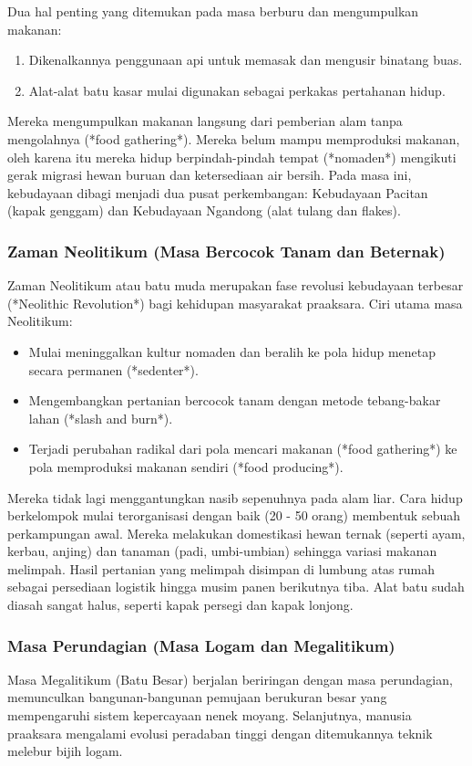 \documentclass[12pt, a4paper]{article}
\begin{document}
Dua hal penting yang ditemukan pada masa berburu dan mengumpulkan makanan:
\begin{enumerate}
	\item Dikenalkannya penggunaan api untuk memasak dan mengusir binatang buas.
	\item Alat-alat batu kasar mulai digunakan sebagai perkakas pertahanan hidup.
\end{enumerate}
Mereka mengumpulkan makanan langsung dari pemberian alam tanpa mengolahnya (*food gathering*). Mereka belum mampu memproduksi makanan, oleh karena itu mereka hidup berpindah-pindah tempat (*nomaden*) mengikuti gerak migrasi hewan buruan dan ketersediaan air bersih. Pada masa ini, kebudayaan dibagi menjadi dua pusat perkembangan: Kebudayaan Pacitan (kapak genggam) dan Kebudayaan Ngandong (alat tulang dan flakes).

\subsubsection{Zaman Neolitikum (Masa Bercocok Tanam dan Beternak)}
Zaman Neolitikum atau batu muda merupakan fase revolusi kebudayaan terbesar (*Neolithic Revolution*) bagi kehidupan masyarakat praaksara. Ciri utama masa Neolitikum:
\begin{itemize}
	\item Mulai meninggalkan kultur nomaden dan beralih ke pola hidup menetap secara permanen (*sedenter*).
	\item Mengembangkan pertanian bercocok tanam dengan metode tebang-bakar lahan (*slash and burn*).
	\item Terjadi perubahan radikal dari pola mencari makanan (*food gathering*) ke pola memproduksi makanan sendiri (*food producing*).
\end{itemize}
Mereka tidak lagi menggantungkan nasib sepenuhnya pada alam liar. Cara hidup berkelompok mulai terorganisasi dengan baik (20 - 50 orang) membentuk sebuah perkampungan awal. Mereka melakukan domestikasi hewan ternak (seperti ayam, kerbau, anjing) dan tanaman (padi, umbi-umbian) sehingga variasi makanan melimpah. Hasil pertanian yang melimpah disimpan di lumbung atas rumah sebagai persediaan logistik hingga musim panen berikutnya tiba. Alat batu sudah diasah sangat halus, seperti kapak persegi dan kapak lonjong.

\subsubsection{Masa Perundagian (Masa Logam dan Megalitikum)}
Masa Megalitikum (Batu Besar) berjalan beriringan dengan masa perundagian, memunculkan bangunan-bangunan pemujaan berukuran besar yang mempengaruhi sistem kepercayaan nenek moyang. Selanjutnya, manusia praaksara mengalami evolusi peradaban tinggi dengan ditemukannya teknik melebur bijih logam.
\end{document}
